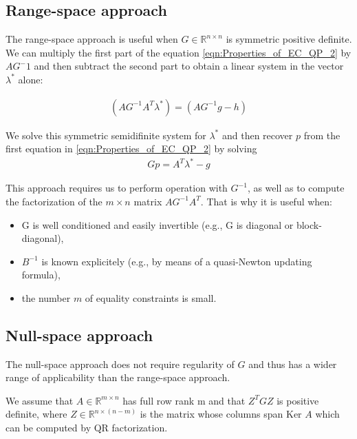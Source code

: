 \subsection*{Range-space approach}
The range-space approach is useful when $G\in \mathbb{R}^{n\times n}$ is symmetric positive definite. We can multiply the first part of the equation \ref{eqn:Properties_of_EC_QP_2}  by $AG^-1$ and then subtract the second part to obtain a linear system in the vector $\lambda^*$ alone:

\begin{equation}
	\begin{aligned}
		(AG^{-1}A^T\lambda^*) = (AG^{-1}g-h)
	\end{aligned}
	\label{eqn:Range_space_1}
\end{equation}

We solve this symmetric semidifinite system for $\lambda^*$ and then recover $p$ from the first equation in \ref{eqn:Properties_of_EC_QP_2} by solving
\begin{equation}
	\begin{aligned}
		Gp = A^T\lambda^*-g
	\end{aligned}
	\label{eqn:Range_space_2}
\end{equation}

This approach requires us to perform operation with $G^{-1}$, as well as to compute the factorization of the $m\times n$ matrix $AG^{-1}A^T$. That is why it is useful when:
\begin{itemize}
	\item G is well conditioned and easily invertible (e.g., G is diagonal or block-diagonal),
	\item $B^{-1}$ is known explicitely (e.g., by means of a quasi-Newton updating formula),
	\item the number $m$ of equality constraints is small.
\end{itemize}

\subsection*{Null-space approach}
The null-space approach does not require regularity of $G$ and thus has a wider range of applicability than the range-space approach.

We assume that $A\in \mathbb{R}^{m\times n}$ has full row rank m and that $Z^TGZ$ is positive definite, where $Z\in \mathbb{R}^{n\times (n-m)}$ is the matrix whose columns span Ker $A$ which can be computed by QR factorization.

